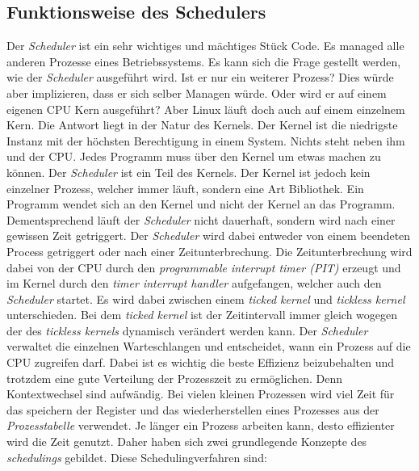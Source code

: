 \newpage

\subsection{Funktionsweise des Schedulers}
Der \textit{Scheduler} ist ein sehr wichtiges und mächtiges Stück Code. Es managed alle anderen Prozesse eines Betriebssystems. Es kann sich die Frage gestellt werden, wie der \textit{Scheduler} ausgeführt wird. Ist er nur ein weiterer Prozess? Dies würde aber implizieren, dass er sich selber Managen würde. Oder wird er auf einem eigenen CPU Kern ausgeführt? Aber Linux läuft doch auch auf einem einzelnem Kern. Die Antwort liegt in der Natur des Kernels.
\medskip
\newline
Der Kernel ist die niedrigste Instanz mit der höchsten Berechtigung in einem System. Nichts steht neben ihm und der CPU. Jedes Programm muss über den Kernel um etwas machen zu können. Der \textit{Scheduler} ist ein Teil des Kernels. Der Kernel ist jedoch kein einzelner Prozess, welcher immer läuft, sondern eine Art Bibliothek. Ein Programm wendet sich an den Kernel und nicht der Kernel an das Programm. Dementsprechend läuft der \textit{Scheduler} nicht dauerhaft, sondern wird nach einer gewissen Zeit getriggert. Der \textit{Scheduler} wird dabei entweder von einem beendeten Process getriggert oder nach einer Zeitunterbrechung. Die Zeitunterbrechung wird dabei von der CPU durch den \textit{programmable interrupt timer (PIT)} erzeugt und im Kernel durch den \textit{timer interrupt handler} aufgefangen, welcher auch den \textit{Scheduler} startet. Es wird dabei zwischen einem \textit{ticked kernel} und \textit{tickless kernel} unterschieden. Bei dem \textit{ticked kernel} ist der Zeitintervall immer gleich wogegen der des \textit{tickless kernels} dynamisch verändert werden kann.
\bigskip
\newline
Der \textit{Scheduler} verwaltet die einzelnen Warteschlangen und entscheidet, wann ein Prozess auf die CPU zugreifen darf. Dabei ist es wichtig die beste Effizienz beizubehalten und trotzdem eine gute Verteilung der Prozesszeit zu ermöglichen. Denn Kontextwechsel sind aufwändig. Bei vielen kleinen Prozessen wird viel Zeit für das speichern der Register und das wiederherstellen eines Prozesses aus der \textit{Prozesstabelle} verwendet. Je länger ein Prozess arbeiten kann, desto effizienter wird die Zeit genutzt. Daher haben sich zwei grundlegende Konzepte des \textit{schedulings} gebildet. Diese Schedulingverfahren sind:
